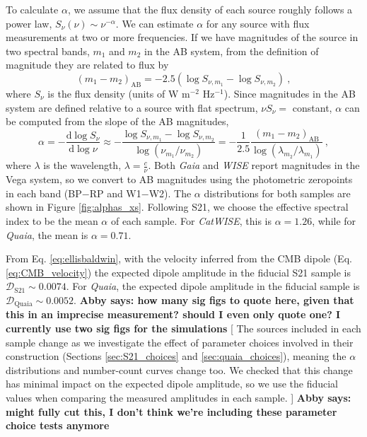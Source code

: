 \documentclass[modern]{aastex631}
\newcommand{\abby}[1]{\textbf{Abby says: #1}}
\newcommand{\catwise}{\textsl{CatWISE}\xspace}
\newcommand{\quaia}{\textsl{Quaia}\xspace}
\newcommand{\gaia}{\textsl{Gaia}\xspace}
\newcommand{\wise}{\textsl{WISE}\xspace}
\newcommand{\dd}{\mathrm{d}}
\begin{document}
To calculate $\alpha$, we assume that the flux density of each source roughly follows a power law, $S_\nu(\nu)\sim\nu^{-\alpha}$.
We can estimate $\alpha$ for any source with flux measurements at two or more frequencies.
If we have magnitudes of the source in two spectral bands, $m_1$ and $m_2$ in the AB system, from the definition of magnitude they are related to flux by
\begin{equation}
    (m_1-m_2)_\mathrm{AB}=-2.5(\log S_{\nu,m_1}-\log S_{\nu,m_2}) ~,
\end{equation}
where $S_{\nu}$ is the flux density (units of W m$^{-2}$ Hz$^{-1}$).
Since magnitudes in the AB system are defined relative to a source with flat spectrum, $\nu S_\nu=$ constant, $\alpha$ can be computed from the slope of the AB magnitudes,
\begin{equation}
    \alpha = -\frac{\dd\log S_\nu}{\dd\log\nu} \approx -\frac{\log S_{\nu,m_1}-\log S_{\nu,m_2}}{\log\left(\nu_{m_1}/\nu_{m_2}\right)} = -\frac{1}{2.5}\frac{(m_1-m_2)_{\mathrm{AB}}}{\log(\lambda_{m_2}/\lambda_{m_1})} ~,
\end{equation}
where $\lambda$ is the wavelength, $\lambda=\frac{c}{\nu}$.
Both \gaia and \wise report magnitudes in the Vega system, so we convert to AB magnitudes using the photometric zeropoints in each band (BP$-$RP and W1$-$W2).
The $\alpha$ distributions for both samples are shown in Figure \ref{fig:alphas_xs}.
Following S21, we choose the effective spectral index to be the mean $\alpha$ of each sample.
For \catwise, this is $\alpha=1.26$, while for \quaia, the mean is $\alpha=0.71$.

From Eq. \ref{eq:ellisbaldwin}, with the velocity inferred from the CMB dipole (Eq. \ref{eq:CMB_velocity}) the expected dipole amplitude in the fiducial S21 sample is $\mathcal{D}_\mathrm{S21}\sim 0.0074$.
For \quaia, the expected dipole amplitude in the fiducial sample is $\mathcal{D}_\mathrm{Quaia}\sim 0.0052$.
\abby{how many sig figs to quote here, given that this in an imprecise measurement? should I even only quote one? I currently use two sig figs for the simulations}
[
The sources included in each sample change as we investigate the effect of parameter choices involved in their construction (Sections \ref{sec:S21_choices} and \ref{sec:quaia_choices}), meaning the $\alpha$ distributions and number-count curves change too.
We checked that this change has minimal impact on the expected dipole amplitude, so we use the fiducial values when comparing the measured amplitudes in each sample.
]
\abby{might fully cut this, I don't think we're including these parameter choice tests anymore}
\end{document}
